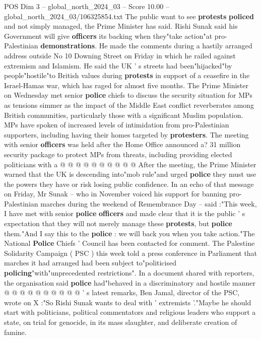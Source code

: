 \begin{textsample}{POS Dim 3 – global\_north\_2024\_03 – Score 10.00 – global\_north\_2024\_03/106325854.txt}  \label{ex:f3_pos_298}
The public want to see \textbf{protests} \textbf{policed} and not simply managed, the Prime Minister has said.
Rishi Sunak said his Government will give \textbf{officers} its backing when they"take action"at pro-Palestinian \textbf{demonstrations}.
He made the comments during a hastily arranged address outside No 10 Downing Street on Friday in which he railed against extremism and Islamism.
He said the UK ' s streets had been"hijacked"by people"hostile"to British values during \textbf{protests} in support of a ceasefire in the Israel-Hamas war, which has raged for almost five months.
The Prime Minister on Wednesday met senior \textbf{police} chiefs to discuss the security situation for MPs as tensions simmer as the impact of the Middle East conflict reverberates among British communities, particularly those with a significant Muslim population.
MPs have spoken of increased levels of intimidation from pro-Palestinian supporters, including having their homes targeted by \textbf{protesters}.
The meeting with senior \textbf{officers} was held after the Home Office announced a? 31 million security package to protect MPs from threats, including providing elected politicians with a @ @ @ @ @ @ @ @ @ @ After the meeting, the Prime Minister warned that the UK is descending into"mob rule"and urged \textbf{police} they must use the powers they have or risk losing public confidence.
In an echo of that message on Friday, Mr Sunak -- who in November voiced his support for banning pro-Palestinian marches during the weekend of Remembrance Day -- said :"This week, I have met with senior \textbf{police} \textbf{officers} and made clear that it is the public ' s expectation that they will not merely manage these \textbf{protests}, but \textbf{police} them."And I say this to the \textbf{police} : we will back you when you take action."The National \textbf{Police} Chiefs ' Council has been contacted for comment.
The Palestine Solidarity Campaign ( PSC ) this week told a press conference in Parliament that marches it had arranged had been subject to"politicised \textbf{policing}"with"unprecedented restrictions".
In a document shared with reporters, the organisation said \textbf{police} had"behaved in a discriminatory and hostile manner @ @ @ @ @ @ @ @ @ @ ' s latest remarks, Ben Jamal, director of the PSC, wrote on X :"So Rishi Sunak wants to deal with ' extremists '."Maybe he should start with politicians, political commentators and religious leaders who support a state, on trial for genocide, in its mass slaughter, and deliberate creation of famine.

\end{textsample}
